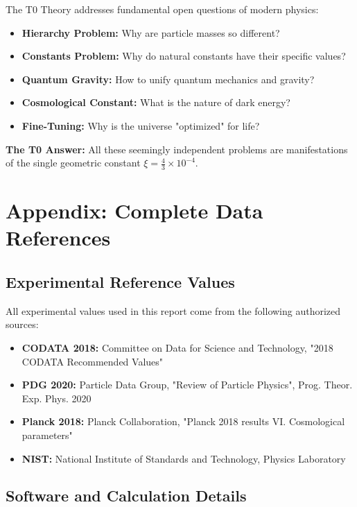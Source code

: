\documentclass[11pt,a4paper]{article}
\begin{document}
	The T0 Theory addresses fundamental open questions of modern physics:
	
	\begin{itemize}
		\item \textbf{Hierarchy Problem:} Why are particle masses so different?
		\item \textbf{Constants Problem:} Why do natural constants have their specific values?
		\item \textbf{Quantum Gravity:} How to unify quantum mechanics and gravity?
		\item \textbf{Cosmological Constant:} What is the nature of dark energy?
		\item \textbf{Fine-Tuning:} Why is the universe "optimized" for life?
	\end{itemize}
	
	\textcolor{t0green}{\textbf{The T0 Answer:}} All these seemingly independent problems are manifestations of the single geometric constant $\xi = \frac{4}{3} \times 10^{-4}$.
	
	\section{Appendix: Complete Data References}
	
	\subsection{Experimental Reference Values}
	
	All experimental values used in this report come from the following authorized sources:
	
	\begin{itemize}
		\item \textbf{CODATA 2018:} Committee on Data for Science and Technology, "2018 CODATA Recommended Values"
		\item \textbf{PDG 2020:} Particle Data Group, "Review of Particle Physics", Prog. Theor. Exp. Phys. 2020
		\item \textbf{Planck 2018:} Planck Collaboration, "Planck 2018 results VI. Cosmological parameters"
		\item \textbf{NIST:} National Institute of Standards and Technology, Physics Laboratory
	\end{itemize}
	
	\subsection{Software and Calculation Details}
	
\end{document}
